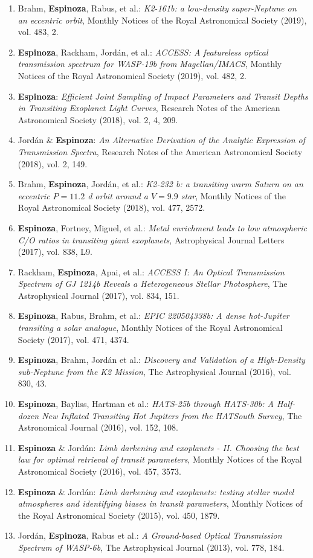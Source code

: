 \documentclass[12pt, a4paper]{article} %
\begin{document}
\begin{flushleft}
\begin{enumerate}
\item Brahm, \textbf{Espinoza}, Rabus, et al.: \textit{K2-161b: a low-density super-Neptune on an eccentric orbit}, Monthly Notices of the Royal Astronomical Society (2019), vol. 483, 2.
\item \textbf{Espinoza}, Rackham, Jord\'an, et al.: \textit{ACCESS: A featureless optical transmission spectrum for WASP-19b from Magellan/IMACS}, Monthly Notices of the Royal Astronomical Society (2019), vol. 482, 2.
\item \textbf{Espinoza}: \textit{Efficient Joint Sampling of Impact Parameters and Transit Depths in Transiting Exoplanet Light Curves}, Research Notes of the American Astronomical Society (2018), vol. 2, 4, 209.
\item Jord\'an \& \textbf{Espinoza}: \textit{An Alternative Derivation of the Analytic Expression of Transmission Spectra}, Research Notes of the American Astronomical Society (2018), vol. 2, 149.
\item Brahm, \textbf{Espinoza}, Jord\'an, et al.: \textit{K2-232 b: a transiting warm Saturn on an eccentric $P = 11.2$ d orbit around a $V = 9.9$ star}, Monthly Notices of the Royal Astronomical Society (2018), vol. 477, 2572.
\item \textbf{Espinoza}, Fortney, Miguel, et al.: \textit{Metal enrichment leads to low atmospheric C/O ratios in transiting giant exoplanets}, Astrophysical Journal Letters (2017), vol. 838, L9.
\item Rackham, \textbf{Espinoza}, Apai, et al.: \textit{ACCESS I: An Optical Transmission Spectrum of GJ 1214b Reveals a Heterogeneous Stellar Photosphere}, The Astrophysical Journal (2017), vol. 834, 151.
\item \textbf{Espinoza}, Rabus, Brahm, et al.: \textit{EPIC 220504338b: A dense hot-Jupiter transiting a solar analogue}, Monthly Notices of the Royal Astronomical Society (2017), vol. 471, 4374.
\item \textbf{Espinoza}, Brahm, Jord\'an et al.: \textit{Discovery and Validation of a High-Density sub-Neptune from the K2 Mission}, The Astrophysical Journal (2016), vol. 830, 43.
\item \textbf{Espinoza}, Bayliss, Hartman et al.: \textit{HATS-25b through HATS-30b: A Half-dozen New Inflated Transiting Hot Jupiters from the HATSouth Survey}, The Astronomical Journal (2016), vol. 152, 108.
\item \textbf{Espinoza} \& Jord\'an: \textit{Limb darkening and exoplanets - II. Choosing the best law for optimal retrieval of transit parameters}, Monthly Notices of the Royal Astronomical Society (2016), vol. 457, 3573.
\item \textbf{Espinoza} \& Jord\'an: \textit{Limb darkening and exoplanets: testing stellar model atmospheres and identifying biases in transit parameters}, Monthly Notices of the Royal Astronomical Society (2015), vol. 450, 1879.
\item Jord\'an, \textbf{Espinoza}, Rabus et al.: \textit{A Ground-based Optical Transmission Spectrum of WASP-6b}, The Astrophysical Journal (2013), vol. 778, 184.
\end{enumerate}


\end{flushleft}
\end{document}
